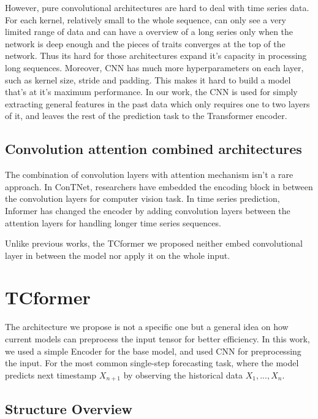 \documentclass[stu,12pt,floatsintext]{apa7}
\begin{document}
However, pure convolutional architectures are hard to deal with time series data. For each kernel, relatively small to the whole sequence, can only see a very limited range of data and can have a overview of a long series only when the network is deep enough and the pieces of traits converges at the top of the network. Thus its hard for those architectures expand it's capacity in processing long sequences. Moreover, CNN has much more hyperparameters on each layer, such as kernel size, stride and padding. This makes it hard to build a model that's at it's maximum performance. In our work, the CNN is used for simply extracting general features in the past data which only requires one to two layers of it, and leaves the rest of the prediction task to the Transformer encoder. 

\subsection{Convolution attention combined architectures}

The combination of convolution layers with attention mechanism isn't a rare approach. In ConTNet, researchers have embedded the encoding block in between the convolution layers \parencite{yan2021contnetuseconvolutiontransformer} for computer vision task. In time series prediction, Informer \parencite{informer} has changed the encoder by adding convolution layers between the attention layers for handling longer time series sequences. 

Unlike previous works, the TCformer we proposed neither embed convolutional layer in between the model nor apply it on the whole input. 

\section{TCformer}

The architecture we propose is not a specific one but a general idea on how current models can preprocess the input tensor for better efficiency. In this work, we used a simple Encoder for the base model, and used CNN for preprocessing the input. For the most common single-step forecasting task, where the model predicts next timestamp $X_{n+1}$ by observing the historical data $X_1,..., X_n$. 

\subsection{Structure Overview}
\end{document}
